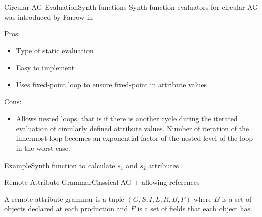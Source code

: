 \begin{frame}{Circular AG Evaluation}{Synth functions}
\alert{Synth function evaluators} for circular AG was introduced by Farrow in \cite{10.1145/13310.13320}

\newlinevspace

{ \footnotesize 

Pros:
\begin{itemize}
    \item Type of \alert{static evaluation}
    \item Easy to implement
    \item Uses \alert{fixed-point loop} to ensure fixed-point in attribute values
\end{itemize}

Cons:
\begin{itemize}
    \item Allows \alert{nested loops}, that is if there is another cycle during the iterated evaluation of circularly defined attribute values. Number of iteration of the innermost loop becomes an \alert{exponential factor} of the nested level of the loop in the worst case.
\end{itemize} }

\end{frame}


\begin{frame}{Example}{Synth function to calculate $s_1$ and $s_2$ attributes}

\begin{minipage}{0.8\linewidth}
\scriptsize
\begin{algorithmic}
        \State {}
        \State {}
    \EndIf
\EndFunction
\State
{}
        \State {}
        \State {}
    \EndIf
\EndFunction
\end{algorithmic}
\end{minipage}

\end{frame}


\begin{frame}{Remote Attribute Grammar}{Classical AG + allowing references}
\begin{definition}
A remote attribute grammar is a tuple $(G,S,I,L,R,B,F)$ where \alert{$B$ is a set of objects} declared at each production and \alert{$F$ is a set of fields} that each object has.
\end{definition}
\end{frame}


